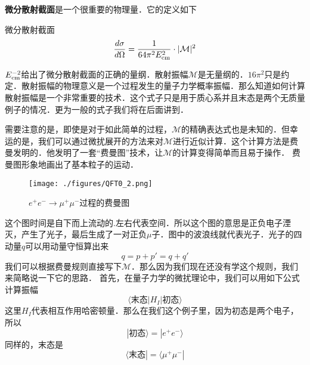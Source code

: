 \textbf{微分散射截面}是一个很重要的物理量．它的定义如下
\begin{definition}{微分散射截面}
\begin{equation}
\frac{d\sigma}{d\Omega} = \frac{1}{64\pi^2E_{\rm cm}^2}\cdot |\mathcal M|^2
\end{equation}
\end{definition}
$E_{\rm cm}^{-2}$给出了微分散射截面的正确的量纲．散射振幅$\mathcal M$是无量纲的．$16\pi^2$只是约定．散射振幅的物理意义是一个过程发生的量子力学概率振幅．那么知道如何计算散射振幅是一个非常重要的技术．这个式子只是用于质心系并且末态是两个无质量例子的情况．更为一般的式子我们将在后面讲到．

需要注意的是，即使是对于如此简单的过程，$\mathcal M$的精确表达式也是未知的．但幸运的是，我们可以通过微扰展开的方法来对$\mathcal M$进行近似计算．这个计算方法是费曼发明的．他发明了一套“费曼图”技术，让$\mathcal M$的计算变得简单而且易于操作．
费曼图形象地画出了基本粒子的运动．

\begin{figure}[ht]
\centering
\texttt{[image: ./figures/QFT0\_2.png]}
\caption{$e^+e^-\rightarrow\mu^+\mu^-$过程的费曼图} \label{QFT0_fig2}
\end{figure}

这个图时间是自下而上流动的.左右代表空间．所以这个图的意思是正负电子湮灭，产生了光子，最后生成了一对正负$\mu$子．图中的波浪线就代表光子．光子的四动量$q$可以用动量守恒算出来
\begin{equation}
q=p+p'=q+q'
\end{equation}
我们可以根据费曼规则直接写下$\mathcal M$．那么因为我们现在还没有学这个规则，我们来简略说一下它的思路． 首先，在量子力学的微扰理论中，我们可以用如下公式计算振幅
\begin{equation}
\langle \text{末态} |H_I| \text{初态} \rangle
\end{equation}
这里$H_I$代表相互作用哈密顿量．那么在我们这个例子里，因为初态是两个电子，所以
\begin{equation}
| \text{初态} \rangle = | e^+ e^- \rangle
\end{equation}
同样的，末态是
\begin{equation}
\langle \text{末态} | = \langle \mu^+ \mu^- |
\end{equation}


















